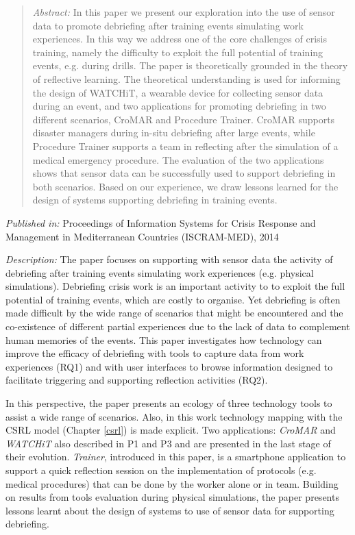 \begin{quote}
	\emph{Abstract:} In this paper we present our exploration into the use of sensor data to promote debriefing after training events simulating work experiences. In this way we address one of the core challenges of crisis training, namely the difficulty to exploit the full potential of training events, e.g. during drills. The paper is theoretically grounded in the theory of reflective learning. The theoretical understanding is used for informing the design of WATCHiT, a wearable device for collecting sensor data during an event, and two applications for promoting debriefing in two different scenarios, CroMAR and Procedure Trainer. CroMAR supports disaster managers during in-situ debriefing after large events, while Procedure Trainer supports a team in reflecting after the simulation of a medical emergency procedure. The evaluation of the two applications shows that sensor data can be successfully used to support debriefing in both scenarios. Based on our experience, we draw lessons learned for the design of systems supporting debriefing in training events. 
\end{quote}

\emph{Published in:} Proceedings of Information Systems for Crisis Response and Management in Mediterranean Countries (ISCRAM-MED), 2014

\emph{Description:} The paper focuses on supporting with sensor data the activity of debriefing after training events simulating work experiences (e.g. physical simulations). Debriefing crisis work is an important activity to to exploit the full potential of training events, which are costly to organise. Yet debriefing is often made difficult by the wide range of scenarios that might be encountered and the co-existence of different partial experiences due to the lack of data to complement human memories of the events. This paper investigates how technology can improve the efficacy of debriefing with tools to capture data from work experiences (RQ1) and with user interfaces to browse information designed to facilitate triggering and supporting reflection activities (RQ2).

In this perspective, the paper presents an ecology of three technology tools to assist a wide range of scenarios. Also, in this work technology mapping with the CSRL model (Chapter \ref{csrl}) is made explicit. Two applications: \emph{CroMAR} and \emph{WATCHiT} also described in P1 and P3 and are presented in the last stage of their evolution. \emph{Trainer}, introduced in this paper, is a smartphone application to support a quick reflection session on the implementation of protocols (e.g. medical procedures) that can be done by the worker alone or in team. Building on results from tools evaluation during physical simulations, the paper presents lessons learnt about the design of systems to use of sensor data for supporting debriefing. 

